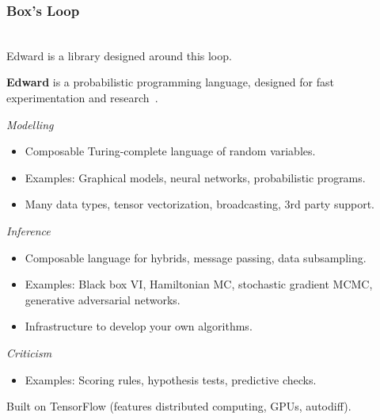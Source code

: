 \documentclass[10pt]{beamer}
\begin{document}
\begin{frame}
\frametitle{Box's Loop}
\center
{} \\
\vspace{20pt}
Edward is a library designed around this loop. \\
\citep{box_science_1976-1, box_sampling_1980-1, david_m._blei_build_2014}
\end{frame}


\begin{frame}
\vspace{3ex}
\textbf{Edward} is a probabilistic programming language,
designed for fast experimentation and research~\citep{tran_deep_2017}.

\emph{Modelling}
\begin{itemize}
\item Composable Turing-complete language of random variables.
\item Examples: Graphical models, neural networks, probabilistic programs.
\item Many data types, tensor vectorization, broadcasting, 3rd party support.
\end{itemize}

\emph{Inference}
\begin{itemize}
\item Composable language for hybrids, message passing, data subsampling.
\item Examples: Black box VI, Hamiltonian MC, stochastic gradient MCMC,
  generative adversarial networks.
\item Infrastructure to develop your own algorithms.
\end{itemize}

\emph{Criticism}
\begin{itemize}
\item Examples: Scoring rules, hypothesis tests, predictive checks.
\end{itemize}

\vspace{1ex}
Built on TensorFlow (features distributed computing, GPUs, autodiff).
\end{frame}
\end{document}
